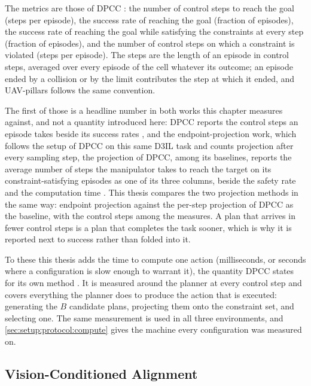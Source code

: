 The metrics are those of \ac{DPCC} \parencite[Sec.~6.1]{romer2025diffusion}: the number of control
steps to reach the goal (steps per episode), the success rate of reaching the goal (fraction of episodes),
the success rate of reaching the goal while satisfying the constraints at every step (fraction of
episodes), and the number of control steps on which a constraint is violated (steps per episode). The steps are the length
of an episode in control steps, averaged over every episode of the cell whatever its outcome; an episode ended by a
collision or by the limit contributes the step at which it ended, and UAV-pillars follows the same convention.

The first of those is a headline number in both works this chapter measures against, and not a
quantity introduced here: \ac{DPCC} reports the control steps an episode takes beside its success
rates \parencite[Sec.~6.1]{romer2025diffusion}, and the endpoint-projection work, which follows the setup of
\ac{DPCC} on this same D3IL task and counts projection after every sampling step, the projection of \ac{DPCC},
among its baselines, reports the average number of steps the manipulator takes to reach the target on its
constraint-satisfying episodes as one of its three columns, beside the safety rate and the computation time
\parencite[Sec.~VII-A, Table~II]{li2025hardflow}. This thesis compares the two projection methods in the same
way: endpoint projection against the per-step projection of \ac{DPCC} as the baseline, with the control steps
among the measures. A plan that arrives in
fewer control steps is a plan that completes the task sooner, which is why it is reported next to
success rather than folded into it.

To these this thesis adds the time to compute one action (milliseconds, or seconds where a
configuration is slow enough to warrant it), the quantity \ac{DPCC} states for its own
method \parencite[Sec.~6]{romer2025diffusion}. It is measured around the planner at every control step
and covers everything the planner does to produce the action that is executed: generating the $B$
candidate plans, projecting them onto the constraint set, and selecting one. The same measurement is
used in all three environments, and
\autoref{sec:setup:protocol:compute} gives the machine every configuration was measured on.

\subsection{Vision-Conditioned Alignment}\label{sec:setup:metrics:aligning}


